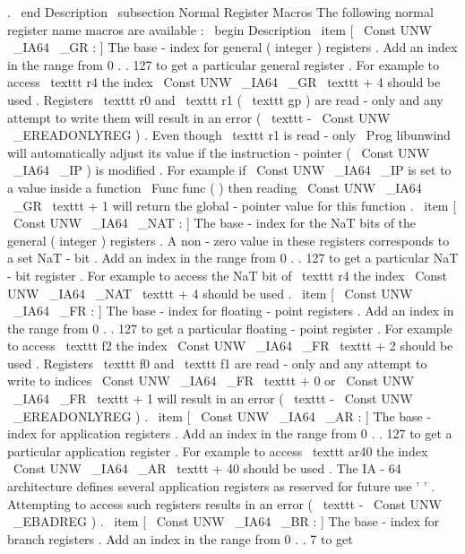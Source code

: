 .
\
end
{
Description
}
\
subsection
{
Normal
Register
Macros
}
The
following
normal
register
name
macros
are
available
:
\
begin
{
Description
}
\
item
[
\
Const
{
UNW
\
_IA64
\
_GR
}
:
]
The
base
-
index
for
general
(
integer
)
registers
.
Add
an
index
in
the
range
from
0
.
.
127
to
get
a
particular
general
register
.
For
example
to
access
\
texttt
{
r4
}
the
index
\
Const
{
UNW
\
_IA64
\
_GR
}
\
texttt
{
+
4
}
should
be
used
.
Registers
\
texttt
{
r0
}
and
\
texttt
{
r1
}
(
\
texttt
{
gp
}
)
are
read
-
only
and
any
attempt
to
write
them
will
result
in
an
error
(
\
texttt
{
-
}
\
Const
{
UNW
\
_EREADONLYREG
}
)
.
Even
though
\
texttt
{
r1
}
is
read
-
only
\
Prog
{
libunwind
}
will
automatically
adjust
its
value
if
the
instruction
-
pointer
(
\
Const
{
UNW
\
_IA64
\
_IP
}
)
is
modified
.
For
example
if
\
Const
{
UNW
\
_IA64
\
_IP
}
is
set
to
a
value
inside
a
function
\
Func
{
func
}
(
)
then
reading
\
Const
{
UNW
\
_IA64
\
_GR
}
\
texttt
{
+
1
}
will
return
the
global
-
pointer
value
for
this
function
.
\
item
[
\
Const
{
UNW
\
_IA64
\
_NAT
}
:
]
The
base
-
index
for
the
NaT
bits
of
the
general
(
integer
)
registers
.
A
non
-
zero
value
in
these
registers
corresponds
to
a
set
NaT
-
bit
.
Add
an
index
in
the
range
from
0
.
.
127
to
get
a
particular
NaT
-
bit
register
.
For
example
to
access
the
NaT
bit
of
\
texttt
{
r4
}
the
index
\
Const
{
UNW
\
_IA64
\
_NAT
}
\
texttt
{
+
4
}
should
be
used
.
\
item
[
\
Const
{
UNW
\
_IA64
\
_FR
}
:
]
The
base
-
index
for
floating
-
point
registers
.
Add
an
index
in
the
range
from
0
.
.
127
to
get
a
particular
floating
-
point
register
.
For
example
to
access
\
texttt
{
f2
}
the
index
\
Const
{
UNW
\
_IA64
\
_FR
}
\
texttt
{
+
2
}
should
be
used
.
Registers
\
texttt
{
f0
}
and
\
texttt
{
f1
}
are
read
-
only
and
any
attempt
to
write
to
indices
\
Const
{
UNW
\
_IA64
\
_FR
}
\
texttt
{
+
0
}
or
\
Const
{
UNW
\
_IA64
\
_FR
}
\
texttt
{
+
1
}
will
result
in
an
error
(
\
texttt
{
-
}
\
Const
{
UNW
\
_EREADONLYREG
}
)
.
\
item
[
\
Const
{
UNW
\
_IA64
\
_AR
}
:
]
The
base
-
index
for
application
registers
.
Add
an
index
in
the
range
from
0
.
.
127
to
get
a
particular
application
register
.
For
example
to
access
\
texttt
{
ar40
}
the
index
\
Const
{
UNW
\
_IA64
\
_AR
}
\
texttt
{
+
40
}
should
be
used
.
The
IA
-
64
architecture
defines
several
application
registers
as
reserved
for
future
use
'
'
.
Attempting
to
access
such
registers
results
in
an
error
(
\
texttt
{
-
}
\
Const
{
UNW
\
_EBADREG
}
)
.
\
item
[
\
Const
{
UNW
\
_IA64
\
_BR
}
:
]
The
base
-
index
for
branch
registers
.
Add
an
index
in
the
range
from
0
.
.
7
to
get
